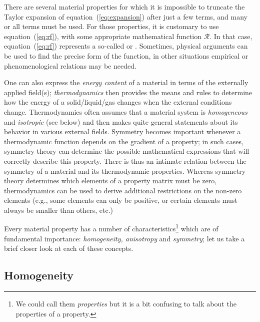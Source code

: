 There are several material properties for which it is impossible to truncate the Taylor expansion of equation~(\ref{eq:expansion}) after just a few terms, and many or all terms must be used. For those properties, it is customary to use equation~(\ref{eq:rf}), with some appropriate mathematical function $\mathcal{R}$. In that case, equation~(\ref{eq:rf}) represents a so-called  or .  Sometimes, physical arguments can be used to find the precise form of the function, in other situations empirical or phenomenological relations may be needed.

One can also express the \textit{energy content} of a material in terms of the externally applied field(s); \textit{thermodynamics} then provides the means and rules to determine how the energy of a solid/liquid/gas changes when the external conditions change.  Thermodynamics often assumes that a material system is \textit{homogeneous} and \textit{isotropic} (see below) and then makes quite general statements about its behavior in various external fields.  Symmetry becomes important whenever a thermodynamic function depends on the gradient of a property; in such cases, symmetry theory can determine the possible mathematical expressions that will correctly describe this property.  There is thus an intimate relation between the symmetry of a material and its thermodynamic properties.  Whereas symmetry theory determines which elements of a property matrix must be zero, thermodynamics can be used to derive additional restrictions on the non-zero elements (e.g., some elements can only be positive, or certain elements must always be smaller than others, etc.)  

Every material property has a number of characteristics\footnote{We could call them \textit{properties} but it is a bit confusing to talk about the properties of a property.} which are of fundamental importance: \textit{homogeneity, anisotropy} and \textit{symmetry}; let us take a brief closer look at each of these concepts.

\subsection{Homogeneity}

